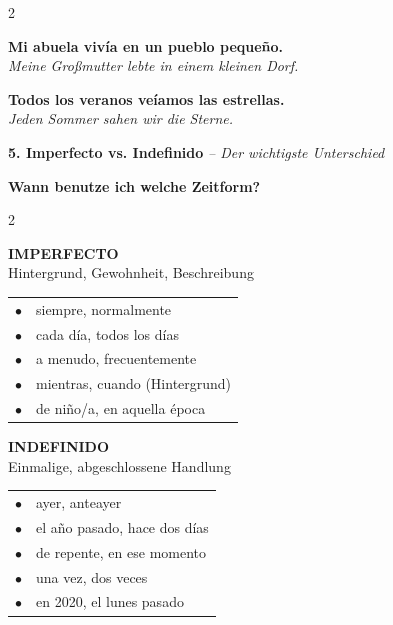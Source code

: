 \documentclass[11pt, a4paper]{article}
\newcommand{\seriftext}[1]{{\fontfamily{ppl}\selectfont #1}}
\newcommand{\es}[1]{\seriftext{\textbf{#1}}}
\newcommand{\de}[1]{\textit{\textcolor{akzent}{#1}}}
\newcommand{\abschnitt}[2]{\noindent\textbf{\large #1. #2}}
\begin{document}
\begin{multicols}{2}
\begin{vokabelbox}
{\vspace{4pt}
\es{Mi abuela vivía en un pueblo pequeño.}\\
\de{Meine Großmutter lebte in einem kleinen Dorf.}

\vspace{4pt}
\es{Todos los veranos veíamos las estrellas.}\\
\de{Jeden Sommer sahen wir die Sterne.}}
\end{vokabelbox}

\end{multicols}

\newpage

\abschnitt{5}{Imperfecto vs. Indefinido} \de{-- Der wichtigste Unterschied}

\vspace{4pt}

\begin{merkbox}
\textbf{Wann benutze ich welche Zeitform?}

\vspace{4pt}
\begin{multicols}{2}

\textbf{\textcolor{colorrojo}{IMPERFECTO}}\\
Hintergrund, Gewohnheit, Beschreibung

\vspace{4pt}
\begin{tabular}{@{}ll@{}}
$\bullet$ & siempre, normalmente \\
$\bullet$ & cada día, todos los días \\
$\bullet$ & a menudo, frecuentemente \\
$\bullet$ & mientras, cuando (Hintergrund) \\
$\bullet$ & de niño/a, en aquella época \\
\end{tabular}

\columnbreak

\textbf{\textcolor{colorazul}{INDEFINIDO}}\\
Einmalige, abgeschlossene Handlung

\vspace{4pt}
\begin{tabular}{@{}ll@{}}
$\bullet$ & ayer, anteayer \\
$\bullet$ & el año pasado, hace dos días \\
$\bullet$ & de repente, en ese momento \\
$\bullet$ & una vez, dos veces \\
$\bullet$ & en 2020, el lunes pasado \\
\end{tabular}

\end{multicols}
\end{merkbox}
\end{document}
